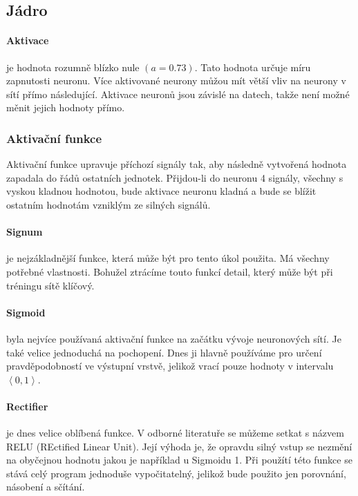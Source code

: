 \documentclass[12pt,a4paper]{report}
\begin{document}
	\subsection{Jádro}
		\paragraph{Aktivace}
		je hodnota rozumně blízko nule $(a=0.73)$. Tato hodnota určuje míru zapnutosti neuronu. Více aktivované neurony můžou mít větší vliv na neurony v sítí přímo následující. Aktivace neuronů jsou závislé na datech, takže není možné měnit jejich hodnoty přímo.
		\subsubsection{Aktivační funkce}
		Aktivační funkce upravuje příchozí signály tak, aby následně vytvořená hodnota zapadala do řádů ostatních jednotek. Přijdou-li do neuronu 4 signály, všechny s vyskou kladnou hodnotou, bude aktivace neuronu kladná a bude se blížit ostatním hodnotám vzniklým ze silných signálů.
		\paragraph{Signum}
		je nejzákladnější funkce, která může být pro tento úkol použita. Má všechny potřebné vlastnosti. Bohužel ztrácíme touto funkcí detail, který může být při tréningu sítě klíčový.
		\paragraph{Sigmoid}
		byla nejvíce používaná aktivační funkce na začátku vývoje neuronových sítí. Je také velice jednoduchá na pochopení. Dnes ji hlavně používáme pro určení pravděpodobností ve výstupní vrstvě, jelikož vrací pouze hodnoty v intervalu $\left<0,1\right>$.
		\paragraph{Rectifier}
		je dnes velice oblíbená funkce. V odborné literatuře se můžeme setkat s názvem RELU (REctified Linear Unit). Její výhoda je, že opravdu silný vstup se nezmění na obyčejnou hodnotu jakou je například u Sigmoidu 1. Při použítí této funkce se stává celý program jednoduše vypočitatelný, jelikož bude použito jen porovnání, násobení a sčítání.
\end{document}
